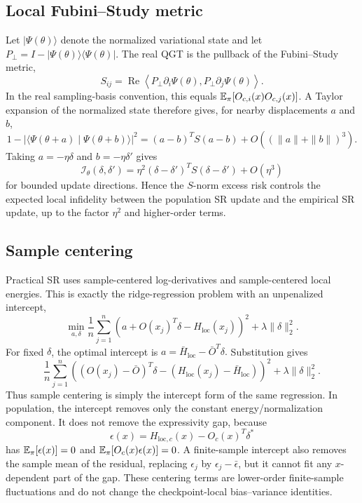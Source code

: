 \subsection{Local Fubini--Study metric}

Let \(|\Psi(\theta)\rangle\) denote the normalized variational state and let
\(P_\perp=I-|\Psi(\theta)\rangle\langle\Psi(\theta)|\). The real QGT is the
pullback of the Fubini--Study metric,
\[
    S_{ij}
    =
    \operatorname{Re}
    \left\langle
        P_\perp\partial_i\Psi(\theta),
        P_\perp\partial_j\Psi(\theta)
    \right\rangle .
\]
In the real sampling-basis convention, this equals
\(\mathbb{E}_\pi[O_{c,i}(x)O_{c,j}(x)]\). A Taylor expansion of the normalized state
therefore gives, for nearby displacements \(a\) and \(b\),
\[
    1-
    \left|
        \langle \Psi(\theta+a)\mid\Psi(\theta+b)\rangle
    \right|^2
    =
    (a-b)^T S(a-b)
    +
    O\!\left((\|a\|+\|b\|)^3\right).
\]
Taking \(a=-\eta\delta\) and \(b=-\eta\delta'\) gives
\[
    \mathcal I_\theta(\delta,\delta')
    =
    \eta^2
    (\delta-\delta')^T S(\delta-\delta')
    +
    O(\eta^3)
\]
for bounded update directions. Hence the \(S\)-norm excess risk controls the
expected local infidelity between the population SR update and the empirical SR
update, up to the factor \(\eta^2\) and higher-order terms.


\subsection{Sample centering}

Practical SR uses sample-centered log-derivatives and sample-centered local
energies. This is exactly the ridge-regression problem with an unpenalized
intercept,
\[
    \min_{a,\delta}
    \frac1n\sum_{j=1}^n
    \left(
        a+O(x_j)^T\delta-H_{\mathrm{loc}}(x_j)
    \right)^2
    +\lambda\|\delta\|_2^2 .
\]
For fixed \(\delta\), the optimal intercept is
$
    a=\bar H_{\mathrm{loc}}-\bar O^T\delta .
$
Substitution gives
\[
    \frac1n\sum_{j=1}^n
    \left(
        (O(x_j)-\bar O)^T\delta
        -(H_{\mathrm{loc}}(x_j)-\bar H_{\mathrm{loc}})
    \right)^2
    +\lambda\|\delta\|_2^2 .
\]
Thus sample centering is simply the intercept form of the same regression.
In population, the intercept removes only the constant energy/normalization
component. It does not remove the expressivity gap, because
\[
    \epsilon(x)=H_{\mathrm{loc},c}(x)-O_c(x)^T\delta^*
\]
has \(\mathbb{E}_\pi[\epsilon(x)]=0\) and
\(\mathbb{E}_\pi[O_c(x)\epsilon(x)]=0\). A finite-sample intercept also removes the
sample mean of the residual, replacing \(\epsilon_j\) by
\(\epsilon_j-\bar\epsilon\), but it cannot fit any \(x\)-dependent part of the
gap. These centering terms are lower-order finite-sample fluctuations and do
not change the checkpoint-local bias--variance identities.

